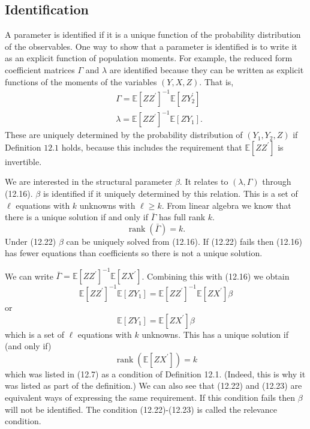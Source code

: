 \documentclass[10pt]{article}
\begin{document}
\subsection{Identification}
A parameter is identified if it is a unique function of the probability distribution of the observables. One way to show that a parameter is identified is to write it as an explicit function of population moments. For example, the reduced form coefficient matrices $\Gamma$ and $\lambda$ are identified because they can be written as explicit functions of the moments of the variables $(Y, X, Z)$. That is,
$$
\begin{aligned}
&\Gamma=\mathbb{E}\left[Z Z^{\prime}\right]^{-1} \mathbb{E}\left[Z Y_{2}^{\prime}\right] \\
&\lambda=\mathbb{E}\left[Z Z^{\prime}\right]^{-1} \mathbb{E}\left[Z Y_{1}\right] .
\end{aligned}
$$
These are uniquely determined by the probability distribution of $\left(Y_{1}, Y_{2}, Z\right)$ if Definition $12.1$ holds, because this includes the requirement that $\mathbb{E}\left[Z Z^{\prime}\right]$ is invertible.

We are interested in the structural parameter $\beta$. It relates to $(\lambda, \Gamma)$ through (12.16). $\beta$ is identified if it uniquely determined by this relation. This is a set of $\ell$ equations with $k$ unknowns with $\ell \geq k$. From linear algebra we know that there is a unique solution if and only if $\bar{\Gamma}$ has full rank $k$.
$$
\operatorname{rank}(\bar{\Gamma})=k .
$$
Under (12.22) $\beta$ can be uniquely solved from (12.16). If (12.22) fails then (12.16) has fewer equations than coefficients so there is not a unique solution.

We can write $\bar{\Gamma}=\mathbb{E}\left[Z Z^{\prime}\right]^{-1} \mathbb{E}\left[Z X^{\prime}\right]$. Combining this with (12.16) we obtain
$$
\mathbb{E}\left[Z Z^{\prime}\right]^{-1} \mathbb{E}\left[Z Y_{1}\right]=\mathbb{E}\left[Z Z^{\prime}\right]^{-1} \mathbb{E}\left[Z X^{\prime}\right] \beta
$$
or
$$
\mathbb{E}\left[Z Y_{1}\right]=\mathbb{E}\left[Z X^{\prime}\right] \beta
$$
which is a set of $\ell$ equations with $k$ unknowns. This has a unique solution if (and only if)
$$
\operatorname{rank}\left(\mathbb{E}\left[Z X^{\prime}\right]\right)=k
$$
which was listed in (12.7) as a condition of Definition 12.1. (Indeed, this is why it was listed as part of the definition.) We can also see that (12.22) and (12.23) are equivalent ways of expressing the same requirement. If this condition fails then $\beta$ will not be identified. The condition (12.22)-(12.23) is called the relevance condition.
\end{document}
